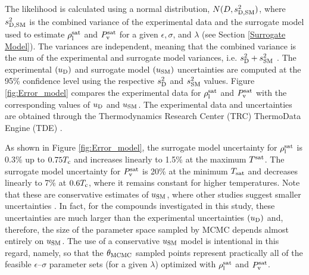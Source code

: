 \documentclass[preprint,letterpaper,floatfix,citeautoscript,aip,jcp]{revtex4-1}
\begin{document}
The likelihood is calculated using a normal distribution, $N(D, s^2_{\rm D,SM})$, where $s^2_{\rm D,SM}$ is the combined variance of the experimental data and the surrogate model used to estimate $\rho_{\rm l}^{\rm sat}$ and $P_{\rm v}^{\rm sat}$ for a given $\epsilon, \sigma$, and $\lambda$ (see Section \ref{Surrogate Model}). The variances 
are independent,
meaning that the combined variance is the sum of the experimental and surrogate model variances, i.e. $s^2_{\rm D} + s^2_{\rm SM}$ \cite{Bay_MD}. The experimental $(u_{\rm D})$ and surrogate model $(u_{\rm SM})$ uncertainties are computed at the 95\% confidence level using the respective $s^2_{\rm D}$ and $s^2_{\rm SM}$ values. Figure \ref{fig:Error_model} compares the experimental data for $\rho_{\rm l}^{\rm sat}$ and $P_{\rm v}^{\rm sat}$ with the corresponding values of $u_{\rm D}$ and $u_{\rm SM}$. The experimental data and uncertainties are obtained through the Thermodynamics Research Center (TRC) ThermoData Engine (TDE) \cite{TDE}. 

As shown in Figure \ref{fig:Error_model}, the surrogate model uncertainty for $\rho_{\rm l}^{\rm sat}$ is 0.3\% up to $0.75 T_{\rm c}$ and increases linearly to 1.5\% at the maximum $T^{\rm sat}$. The surrogate model uncertainty for $P_{\rm v}^{\rm sat}$ is 20\% at the minimum $T_{\rm sat}$ and decreases linearly to 7\% at $0.6 T_{\rm c}$, where it remains constant for higher temperatures. Note that these are conservative estimates of $u_{\rm SM}$, where other studies suggest smaller uncertainties \cite{Mostafa_Diss,Mostafa2018,Postdoc_1}. In fact, for the compounds investigated in this study, these uncertainties are much larger than the experimental uncertainties $(u_{\rm D})$ and, therefore, the size of the parameter space sampled by MCMC depends almost entirely on $u_{\rm SM}$. The use of a conservative $u_{\rm SM}$ model is intentional in this regard, namely, so that the $\theta_{\rm MCMC}$ sampled points represent practically all of the feasible $\epsilon$--$\sigma$ parameter sets (for a given $\lambda$) optimized with $\rho_{\rm l}^{\rm sat}$ and $P_{\rm v}^{\rm sat}$. 

\end{document}

